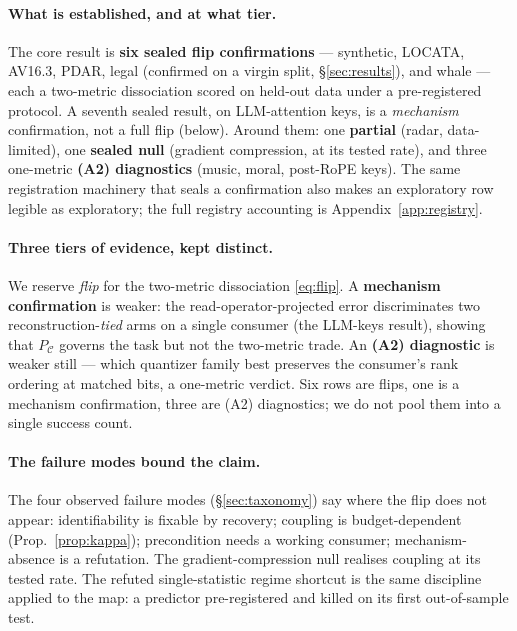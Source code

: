 \documentclass[11pt]{article}
\theoremstyle{remark}
\newcommand{\PC}{P_{\mathcal{C}}}
\begin{document}
\paragraph{What is established, and at what tier.} The core result is \textbf{six sealed
flip confirmations} --- synthetic, LOCATA, AV16.3, PDAR, legal (confirmed on a virgin
split, \S\ref{sec:results}), and whale --- each a two-metric dissociation scored on held-out
data under a pre-registered protocol. A seventh sealed result, on LLM-attention keys, is a
\emph{mechanism} confirmation, not a full flip (below). Around them: one \textbf{partial}
(radar, data-limited), one \textbf{sealed null} (gradient compression, at its tested rate),
and three one-metric \textbf{(A2) diagnostics} (music, moral, post-RoPE keys). The same
registration machinery that seals a confirmation also makes an exploratory row legible as
exploratory; the full registry accounting is Appendix~\ref{app:registry}.

\paragraph{Three tiers of evidence, kept distinct.} We reserve \emph{flip} for the
two-metric dissociation \eqref{eq:flip}. A \textbf{mechanism confirmation} is weaker: the
read-operator-projected error discriminates two reconstruction-\emph{tied} arms on a single
consumer (the LLM-keys result), showing that $\PC$ governs the task but not the two-metric
trade. An \textbf{(A2) diagnostic} is weaker still --- which quantizer family best preserves
the consumer's rank ordering at matched bits, a one-metric verdict. Six rows are flips, one
is a mechanism confirmation, three are (A2) diagnostics; we do not pool them into a single
success count.

\paragraph{The failure modes bound the claim.} The four observed failure modes
(\S\ref{sec:taxonomy}) say where the flip does not appear: identifiability is fixable by
recovery; coupling is budget-dependent (Prop.~\ref{prop:kappa}); precondition needs a
working consumer; mechanism-absence is a refutation. The gradient-compression null realises
coupling at its tested rate. The refuted single-statistic regime shortcut is the same
discipline applied to the map: a predictor pre-registered and killed on its first
out-of-sample test.
\end{document}
